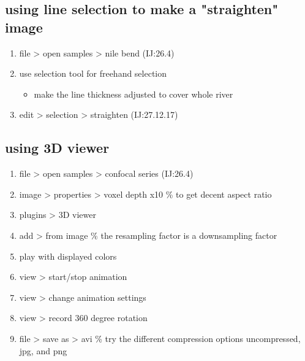 \documentclass[11pt]{article}
\begin{document}
\subsection{using line selection to make a "straighten" image}
\label{sec-10-2}
\begin{enumerate}
\item file > open samples > nile bend (IJ:26.4)
\item use selection tool for freehand selection
\begin{itemize}
\item make the line thickness adjusted to cover whole river
\end{itemize}
\item edit > selection > straighten (IJ:27.12.17)
\end{enumerate}

\subsection{using 3D viewer}
\label{sec-10-3}
\begin{enumerate}
\item file > open samples > confocal series (IJ:26.4)
\item image > properties > voxel depth x10 \% to get decent aspect ratio
\item plugins > 3D viewer
\item add > from image \% the resampling factor is a downsampling factor
\item play with displayed colors
\item view > start/stop animation
\item view > change animation settings
\item view > record 360 degree rotation
\item file > save as > avi \% try the different compression options uncompressed, jpg, and png
\end{enumerate}
\end{document}
